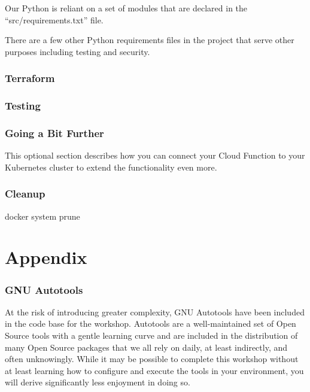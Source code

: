\justifying
Our Python is reliant on a set of modules that are declared in the ``src/requirements.txt'' file.


\justifying
There are a few other Python requirements files in the project that serve other purposes including testing and security.


\section{\label{sec:tf}Terraform}

\section{\label{sec:test}Testing}

\section{\label{sec:next}Going a Bit Further}

\justifying
This optional section describes how you can connect your Cloud Function to your Kubernetes cluster to extend the functionality even more.

\section{\label{sec:cleanup}Cleanup}

\justifying

docker system prune

\clearpage
\part{Appendix}

\appendix

\section{\label{sec:autotools}GNU Autotools}

\justifying
At the risk of introducing greater complexity, GNU Autotools have been included in the code base for the workshop. Autotools
are a well-maintained set of Open Source tools with a gentle learning curve and are included in the distribution of many Open
Source packages that we all rely on daily, at least indirectly, and often unknowingly. While it may be possible to complete this workshop
without at least learning how to configure and execute the tools in your environment, you will derive significantly less enjoyment
in doing so.
\vspace{2mm}

